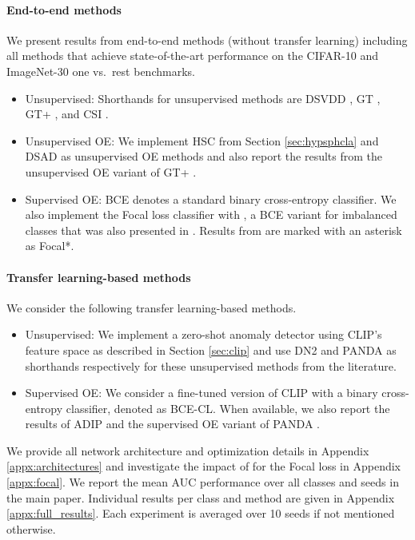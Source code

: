 \documentclass[10pt]{article} \usepackage[accepted]{stylefiles/tmlr}
\begin{document}
\paragraph{End-to-end methods} We present results from end-to-end methods (without transfer learning) including all methods that achieve state-of-the-art performance on the CIFAR-10 and ImageNet-30 one vs.~rest benchmarks.
\begin{itemize}[noitemsep,topsep=-8pt,leftmargin=*]
    \item Unsupervised: Shorthands for unsupervised methods are DSVDD \citep{ruff2018deep}, GT \citep{golan2018deep}, GT+ \citep{hendrycks2019using}, and CSI \citep{tack2020}.
    \item Unsupervised OE: We implement HSC from Section \ref{sec:hypsphcla} and DSAD \citep{ruff2020} as unsupervised OE methods and also report the results from the unsupervised OE variant of GT+ \citep{hendrycks2019using}.
    \item Supervised OE: BCE denotes a standard binary cross-entropy classifier.
    We also implement the Focal loss classifier with  \citep{lin17}, a BCE variant for imbalanced classes that was also presented in \citet{hendrycks2019using}.
    Results from \citet{hendrycks2019using} are marked with an asterisk as Focal*.
\end{itemize}

\paragraph{Transfer learning-based methods} 
We consider the following transfer learning-based methods.
\begin{itemize}[noitemsep,topsep=-8pt,leftmargin=*]
    \item Unsupervised: We implement a zero-shot anomaly detector using CLIP's feature space as described in Section \ref{sec:clip} and use DN2 \citep{bergman2020deep} and PANDA \citep{reiss2021panda} as shorthands respectively for these unsupervised methods from the literature. 
    \item Supervised OE: We consider a fine-tuned version of CLIP with a binary cross-entropy classifier, denoted as BCE-CL.
    When available, we also report the results of ADIP \citep{deecke2021transfer} and the supervised OE variant of PANDA \citep{reiss2021panda}.
\end{itemize} \vspace{1em}


We provide all network architecture and optimization details in Appendix \ref{appx:architectures} and investigate the impact of  for the Focal loss in Appendix \ref{appx:focal}.
We report the mean AUC performance over all classes and seeds in the main paper. 
Individual results per class and method are given in Appendix \ref{appx:full_results}. 
Each experiment is averaged over 10 seeds if not mentioned otherwise.
\end{document}
